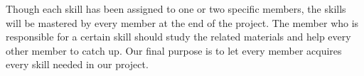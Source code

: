 \documentclass{article}
\begin{document}
Though each skill has been assigned to one or two specific members, the skills will be mastered by every member at the end of the project. The member who is responsible for a certain skill should study the related materials and help every other member to catch up. Our final purpose is to let every member acquires every skill needed in our project. 


\end{document}
